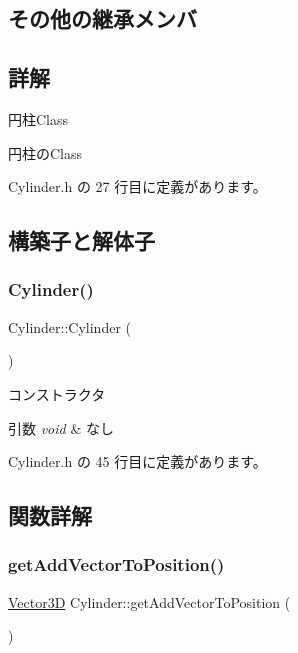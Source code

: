 \subsection*{その他の継承メンバ}


\subsection{詳解}
円柱\+Class 

円柱の\+Class 

 Cylinder.\+h の 27 行目に定義があります。



\subsection{構築子と解体子}
\mbox{\label{class_cylinder_a01dc978cb576f834b9545e43d4dad2a2}} 
\subsubsection{\texorpdfstring{Cylinder()}{Cylinder()}}
{\footnotesize\ttfamily Cylinder\+::\+Cylinder (\begin{DoxyParamCaption}{ }\end{DoxyParamCaption})\hspace{0.3cm}{\ttfamily [inline]}}



コンストラクタ 


\begin{DoxyParams}{引数}
{\em void} & なし \\
\hline
\end{DoxyParams}


 Cylinder.\+h の 45 行目に定義があります。



\subsection{関数詳解}
\mbox{\label{class_cylinder_af36a39d5a18d1a837d9880a00447d87b}} 
\subsubsection{\texorpdfstring{get\+Add\+Vector\+To\+Position()}{getAddVectorToPosition()}}
{\footnotesize\ttfamily \mbox{\hyperlink{class_vector3_d}{Vector3D}} Cylinder\+::get\+Add\+Vector\+To\+Position (\begin{DoxyParamCaption}{ }\end{DoxyParamCaption})\hspace{0.3cm}{\ttfamily [inline]}}



